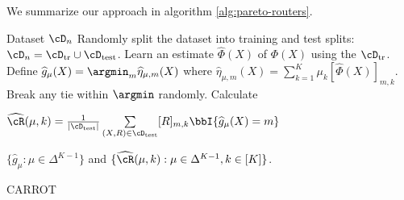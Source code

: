 We summarize our approach in algorithm \ref{alg:pareto-routers}. 
\begin{algorithm}
    \begin{algorithmic}[1]
\REQUIRE Dataset $\cD_n$
\STATE Randomly split the dataset into training and test splits: $\cD_n = \cD_{\text{tr}} \cup \cD_{\text{test}}$. 
\STATE  Learn an estimate $\widehat \Phi (X)$ of $\Phi(X)$ using the $\cD_{\text{tr}}$. 
\STATE  Define $\widehat g_\mu(X) = \argmin_m \widehat \eta_{\mu, m}(X)$ where $\widehat \eta_{\mu, m}(X) =  \sum_{k = 1}^K \mu_k [\widehat \Phi (X)]_{m, k}   $. Break any tie within $\argmin$ randomly.
 \STATE Calculate 
 
 $\widehat \cR(\mu, k)  =  \frac1{|\cD_{\text{test}}|} \sum\limits_{(X, R) \in \cD_{\text{test}}}  [R]_{m, k} \bbI\{ \widehat g_\mu(X) = m\} $
\ENDFOR

 $\{\widehat g_\mu: \mu \in \Delta^{K-1}\}$ and $ \{\widehat \cR(\mu, k): \mu \in \Delta^{K-1}, k\in [K]\}$. 
\end{algorithmic}
\caption{CARROT}
\label{alg:pareto-routers}
\end{algorithm}


